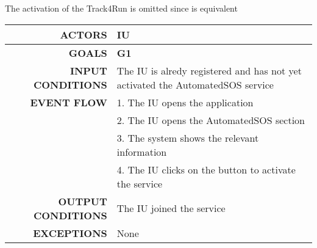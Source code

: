 The activation of the Track4Run is omitted since is equivalent

\begin{table}[h!]
\begin{tabular}{|r|p{3in}|}
\hline
\textbf{ACTORS} & IU\\
\hline
\textbf{GOALS} & \textbf{G1} \\
\hline
\textbf{INPUT CONDITIONS} & The IU is alredy registered and has not yet activated the AutomatedSOS service \\
\hline
\textbf{EVENT FLOW} 
&1. The IU opens the application \\
&2. The IU opens the AutomatedSOS section\\
&3. The system shows the relevant information\\
&4. The IU clicks on the button to activate the service \\
\hline
\textbf{OUTPUT CONDITIONS} & The IU joined the service  \\
\hline
\textbf{EXCEPTIONS} 
& None \\
\hline
\end{tabular}
\end{table}